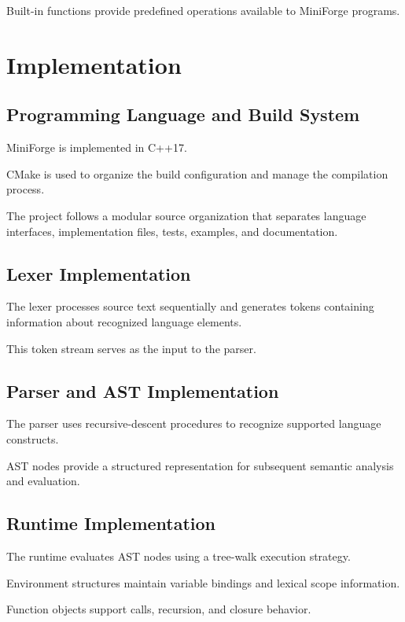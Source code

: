 \documentclass[conference]{IEEEtran}
\begin{document}
Built-in functions provide predefined operations
available to MiniForge programs.

\section{Implementation}

\subsection{Programming Language and Build System}

MiniForge is implemented in C++17.

CMake is used to organize the build configuration
and manage the compilation process.

The project follows a modular source organization
that separates language interfaces, implementation
files, tests, examples, and documentation.

\subsection{Lexer Implementation}

The lexer processes source text sequentially and
generates tokens containing information about
recognized language elements.

This token stream serves as the input to the parser.

\subsection{Parser and AST Implementation}

The parser uses recursive-descent procedures to
recognize supported language constructs.

AST nodes provide a structured representation
for subsequent semantic analysis and evaluation.

\subsection{Runtime Implementation}

The runtime evaluates AST nodes using a tree-walk
execution strategy.

Environment structures maintain variable bindings
and lexical scope information.

Function objects support calls, recursion, and
closure behavior.
\end{document}
